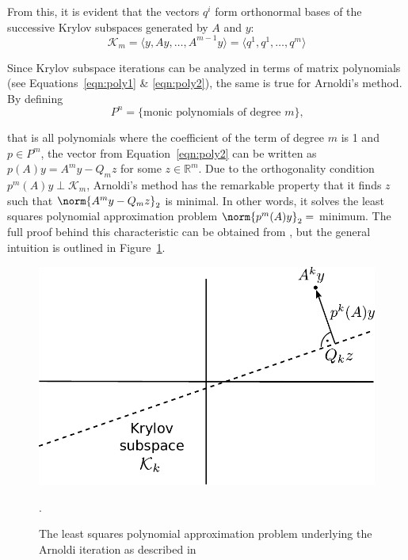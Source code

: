 \noindent From this, it is evident that the vectors $q^i$ form orthonormal bases of the successive Krylov subspaces generated by $A$ and $y$:
\begin{equation}
\label{eqn:krylov_space}
    \mathcal{K}_m=\langle y, Ay, \dots , A^{m-1}y\rangle = \langle q^1,q^1, \dots , q^{m}\rangle
\end{equation}

\noindent Since Krylov subspace iterations can be analyzed in terms of matrix polynomials (see Equations~\hyperref[eqn:poly1]{\ref{eqn:poly1}} \& \hyperref[eqn:poly2]{\ref{eqn:poly2}}), the same is true for Arnoldi's method. By defining 
\begin{equation}
\label{eqn:arnoldi_poly}
    P^n = \{\text{monic polynomials of degree }m\}\text{,}
\end{equation}

\noindent that is all polynomials where the coefficient of the term of degree $m$ is 1 and $p \in P^m$, the vector from Equation~\hyperref[eqn:poly2]{\ref{eqn:poly2}} can be written as $p(A)y=A^my-Q_mz$ for some $z \in \mathbb{R}^m$. Due to the orthogonality condition $p^m(A)y \perp \mathcal{K}_m$, Arnoldi's method has the remarkable property that it finds $z$ such that $\norm{A^my-Q_mz}_2$ is minimal. In other words, it solves the least squares polynomial approximation problem $\norm{p^m(A)y}_2 =$ minimum. The full proof behind this characteristic can be obtained from \cite{trefethen_numerical_1997}, but the general intuition is outlined in Figure~\hyperref[fig:arnoldi]{\ref{fig:arnoldi}}.

\begin{figure}[h]
    \centering
    \includegraphics[width=0.6\linewidth]{figures/Arnoldi.pdf}
    \caption{The least squares polynomial approximation problem underlying the Arnoldi iteration as described in \cite{trefethen_numerical_1997}}.
    \label{fig:arnoldi}
\end{figure}


